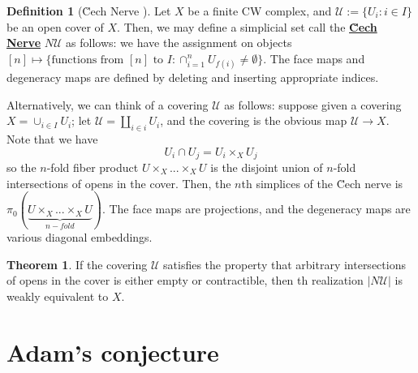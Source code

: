 \documentclass{article}
\theoremstyle{definition}
\newtheorem{theorem}{Theorem}[section]
\theoremstyle{definition}
\newtheorem{definition}{Definition}[theorem]
\theoremstyle{definition}
\theoremstyle{definition}
\theoremstyle{definition}
\theoremstyle{definition}
\theoremstyle{definition}
\begin{document}
\begin{tcolorbox}[colback=purple!5!white,colframe=purple!75!black]
\begin{definition}[\u Cech Nerve ]
Let $X$ be a finite CW complex, and $\mathcal{U}:=\{U_i: i\in I\}$ be an open cover of $X$. Then, we may define a simplicial set call the \underline{\textbf{\u Cech Nerve}} $N \mathcal{U}$ as follows: we have the assignment on objects $[n]\mapsto \{\textrm{functions from }[n] \textrm{ to } I: \cap^n_{i=1}U_{f(i)}\neq \emptyset \}$. The face maps and degeneracy maps are defined by deleting and inserting appropriate indices. 
\end{definition}
\end{tcolorbox}

Alternatively, we can think of a covering $\mathcal{U}$ as follows: suppose given a covering $X=\cup_{i\in I}U_i$; let $\mathcal{U}=\coprod_{i\in i} U_i$, and the covering is the obvious map $\mathcal{U}\to X$. Note that we have 
\[U_i\cap U_j=U_i\times_X U_j\]
so the $n$-fold fiber product $U\times_X...\times_X U$ is the disjoint union of $n$-fold intersections of opens in the cover. Then, the $n$th simplices of the \u Cech nerve is $\pi_0(  \underbrace{U\times_X...\times_X U }_{n-fold})$. The face maps are projections, and the degeneracy maps are various diagonal embeddings.


\begin{tcolorbox}[colback=red!5!white,colframe=red!30!white]
\begin{theorem}
If the covering $\mathcal{U}$ satisfies the property that arbitrary intersections of opens in the cover is either empty or contractible, then th realization $|N \mathcal{U}|$ is weakly equivalent to $X$.
\end{theorem}
\end{tcolorbox}


\section{Adam's conjecture}
\end{document}
